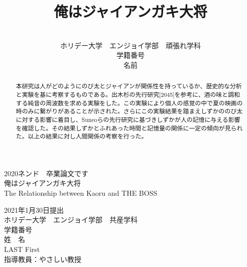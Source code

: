 \documentclass[uplatex,a4paper,10.5pt]{jsreport}
\title{ \Large 俺はジャイアンガキ大将}
\author{\\ホリデー大学　エンジョイ学部　頑張れ学科\\学籍番号\\名前}
\date{}
\begin{document}
\begin{titlepage}

\begin{center}
\vspace*{100truept}
{\Large 2020ネンド　卒業論文です}\\
\vspace{50truept}
{\huge 俺はジャイアンガキ大将}\\ %
\vspace{10truept}
{\large The Relationship between Kaoru and THE BOSS}\\ %
\vspace{60truept}

{\Large 2021年1月30日提出}\\ %
\vspace{60truept}
{\Large ホリデー大学　エンジョイ学部　共産学科}\\
{\Large 学籍番号}\\
{\Large 姓　名}\\ %
{\Large LAST First}\\ %

\vspace{60truept}
{\large
指導教員：やさしい教授\\
}
\end{center}

\end{titlepage}


\begin{abstract}
本研究は人がどのようにのび太とジャイアンが関係性を持っているか、歴史的な分析と実験を基に考察するものである。出木杉の先行研究[2045]を参考に、酒の味と調和する純音の周波数を求める実験をした。この実験により個人の感覚の中で夏の映画の時のみに繋がりがあることが示された。さらにこの実験結果を踏まえしずかののび太に対する影響に着目し、Suneoらの先行研究に基づきしずかが人の記憶に与える影響を確認した。その結果しずかとふれあった時間と記憶量の関係に一定の傾向が見られた。以上の結果に対し人間関係の考察を行った。
\end{abstract}
\end{document}
